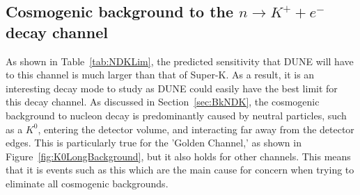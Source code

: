\subsection{Cosmogenic background to the $n \rightarrow K^{+} + e^{-}$ decay channel} \label{sec:NDKCosmBk}
As shown in Table~\ref{tab:NDKLim}, the predicted sensitivity that DUNE will have to this channel is much larger than that of Super-K. As a result, it is an interesting decay mode to study as DUNE could easily have the best limit for this decay channel. As discussed in Section~\ref{sec:BkNDK}, the cosmogenic background to nucleon decay is predominantly caused by neutral particles, such as a $K^0$, entering the detector volume, and interacting far away from the detector edges. This is particularly true for the 'Golden Channel,' as shown in Figure~\ref{fig:K0LongBackground}, but it also holds for other channels. This means that it is events such as this which are the main cause for concern when trying to eliminate all cosmogenic backgrounds. \\

